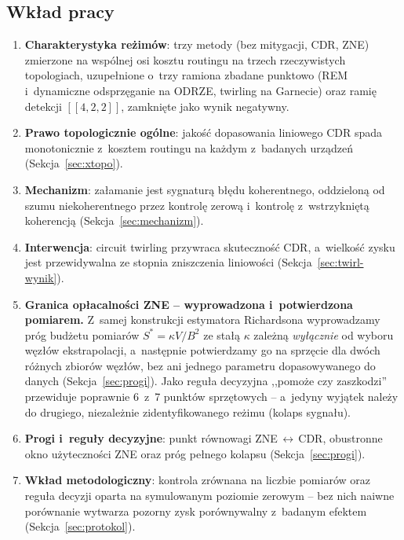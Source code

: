 \documentclass[11pt]{article}
\begin{document}
\subsection*{Wkład pracy}
\begin{enumerate}
  \item \textbf{Charakterystyka reżimów}: trzy metody (bez mitygacji, CDR, ZNE) zmierzone na
        wspólnej osi kosztu routingu na trzech rzeczywistych topologiach, uzupełnione o~trzy
        ramiona zbadane punktowo (REM i~dynamiczne odsprzęganie na ODRZE, twirling na Garnecie)
        oraz ramię detekcji $[[4,2,2]]$, zamknięte jako wynik negatywny.
  \item \textbf{Prawo topologicznie ogólne}: jakość dopasowania liniowego CDR spada monotonicznie
        z~kosztem routingu na każdym z~badanych urządzeń (Sekcja~\ref{sec:xtopo}).
  \item \textbf{Mechanizm}: załamanie jest sygnaturą błędu koherentnego, oddzieloną od szumu
        niekoherentnego przez kontrolę zerową i~kontrolę z~wstrzykniętą koherencją
        (Sekcja~\ref{sec:mechanizm}).
  \item \textbf{Interwencja}: circuit twirling przywraca skuteczność CDR, a~wielkość zysku jest
        przewidywalna ze stopnia zniszczenia liniowości (Sekcja~\ref{sec:twirl-wynik}).
  \item \textbf{Granica opłacalności ZNE -- wyprowadzona i~potwierdzona pomiarem.} Z~samej
        konstrukcji estymatora Richardsona wyprowadzamy próg budżetu pomiarów $S^{*} = \kappa V/B^2$
        ze stałą $\kappa$ zależną \emph{wyłącznie} od wyboru węzłów ekstrapolacji, a~następnie
        potwierdzamy go na sprzęcie dla dwóch różnych zbiorów węzłów, bez ani jednego parametru
        dopasowywanego do danych (Sekcja~\ref{sec:progi}). Jako reguła decyzyjna ,,pomoże czy
        zaszkodzi'' przewiduje poprawnie 6~z~7 punktów sprzętowych -- a~jedyny wyjątek należy do
        drugiego, niezależnie zidentyfikowanego reżimu (kolaps sygnału).
  \item \textbf{Progi i~reguły decyzyjne}: punkt równowagi ZNE\,$\leftrightarrow$\,CDR, obustronne
        okno użyteczności ZNE oraz próg pełnego kolapsu (Sekcja~\ref{sec:progi}).
  \item \textbf{Wkład metodologiczny}: kontrola zrównana na liczbie pomiarów oraz reguła decyzji
        oparta na symulowanym poziomie zerowym -- bez nich naiwne porównanie wytwarza pozorny
        zysk porównywalny z~badanym efektem (Sekcja~\ref{sec:protokol}).
\end{enumerate}
\end{document}
